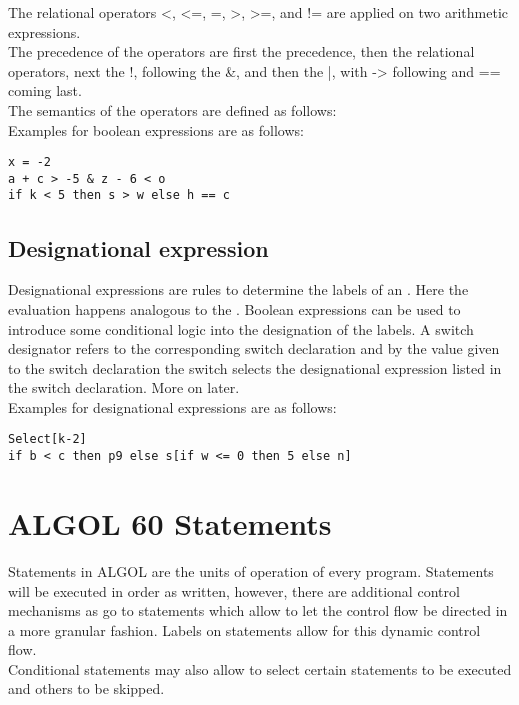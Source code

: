 \documentclass{article}
\begin{document}
The relational operators <, <=, =, >, >=, and != are applied on two arithmetic expressions. \\

The precedence of the operators are first the \label{arithexptypes} precedence, then the relational operators, next the !, following the \&, and then the |, with -\textgreater{} following and == coming last.\\
The semantics of the operators are defined as follows:\\
Examples for boolean expressions are as follows:\\

\begin{lstlisting}[language={[60]algol}]
x = -2
a + c > -5 & z - 6 < o
if k < 5 then s > w else h == c
\end{lstlisting}

\subsection{Designational expression}
Designational expressions are rules to determine the labels of an . Here the evaluation happens analogous to the . Boolean expressions can be used to introduce some conditional logic into the designation of the labels. A switch designator refers to the corresponding switch declaration and by the value given to the switch declaration the switch selects the designational expression listed in the switch declaration. More on  later.\\
Examples for designational expressions are as follows:\\

\begin{lstlisting}[language={[60]algol}]
Select[k-2]
if b < c then p9 else s[if w <= 0 then 5 else n]
\end{lstlisting}

\newpage

\section{ALGOL 60 Statements} \label{statement}
Statements in ALGOL are the units of operation of every program. Statements will be executed in order as written, however, there are additional control mechanisms as go to statements which allow to let the control flow be directed in a more granular fashion. Labels on statements allow for this dynamic control flow.\\
Conditional statements may also allow to select certain statements to be executed and others to be skipped.\\
\end{document}

